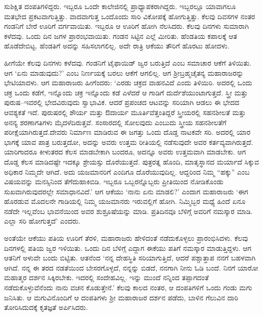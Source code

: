 \vskip 2pt

ಸುಶಿಕ್ಷಿತ ದಂಪತಿಗಳಿದ್ದರು. ಇಬ್ಬರೂ ಒಂದೇ ಕಾಲೇಜಿನಲ್ಲಿ ಪ್ರಾಧ್ಯಾಪಕರಾಗಿದ್ದರು. ಇಬ್ಬರಲ್ಲೂ ಯಾವಾಗಲೂ ಮತಭೇದ ಪ್ರಕಟವಾಗುತ್ತಿತ್ತು. ವಾದವಾಗುತ್ತ ಒಂದೊಂದು ಸಾರಿ ವಿಕೋಪಕ್ಕೆ ಹೋಗುತ್ತಿತ್ತು. ಕೆಲವು ದಿವಸಗಳ ನಂತರ ಗಂಡನಿಗೆ ಬೇರೆ ಊರಿಗೆ ವರ್ಗವಾಯಿತು. ಇಬ್ಬರೂ ಆ ಊರಿಗೆ ಹೋಗಿ ನೆಲಸಿದರು. ಕೆಲವು ದಿನಗಳು ಸುಮಾರಾಗಿ ಕಳೆದವು. ಒಂದು ದಿನ ಜಗಳ ಪ್ರಾರಂಭವಾಯಿತು. ಗಂಡನ ಸಿಟ್ಟಿನ ಎಲ್ಲೆ ಮೀರಿತು. ಹೆಂಡತಿಯ ಕಪಾಲಕ್ಕೆ ಆತ ಹೊಡೆದೇಬಿಟ್ಟ. ಹೆಂಡತಿಗೆ ಅದನ್ನು ಸಹಿಸಲಾಗಲಿಲ್ಲ. ಅದೇ ರಾತ್ರಿ ಆಕೆಯು ತೌರಿಗೆ ಹೊರಟು ಹೋದಳು.

ಹೀಗೆಯೇ ಕೆಲವು ದಿನಗಳು ಕಳೆದವು. ಗಂಡನಿಗೆ ಟೈಫಾಯಿಡ್ ಜ್ವರ ಬರುತ್ತಿದೆ ಎಂಬ ಸಮಾಚಾರ ಆಕೆಗೆ ತಿಳಿಯಿತು. ಆಗ ‘ಏನು ಮಾಡುವುದು?’ ಎಂಬ ನಿರ್ಣಯಕ್ಕೆ ಬರಲು ಆಕೆಗೆ ಆಗಲಿಲ್ಲ. ಆಗ ಶ‍್ರೀಬ್ರಹ್ಮಚೈತನ್ಯ ಮಹಾರಾಜರನ್ನು ಭೇಟಿಯಾದಳು. ಆಗ ಮಹಾರಾಜರು ಹೀಗೆಂದರು: ‘ಎರಡು ಚಕ್ರದ ವಾಹನವಿದೆ ಎಂದು ತಿಳಿಯಿರಿ. ಅದರಲ್ಲಿ ಒಂದು ಚಕ್ರ ಒಂದು ಕಡೆಗೆ, ಇನ್ನೊಂದು ಚಕ್ರ ಇನ್ನೊಂದು ಕಡೆ ಎಳೆದರೆ ಆ ಗಾಡಿಗೆ ದುರ್ದೆಶೆಯುಂಟಾಗುತ್ತದೆ. ಸ್ತ್ರೀ ಮತ್ತು ಪುರುಷ–ಇವರಲ್ಲಿ ಭೇದವಿರುವುದು ಸ್ವಾಭಾವಿಕ. ಆದರೆ ಪ್ರಪಂಚದ ಆಟವನ್ನು ಸರಿಯಾಗಿ ಆಡಲು ಈ ಭೇದದ ಆವಶ್ಯಕತೆ ಇದೆ. ಪುರುಷರಲ್ಲಿ ಶೌರ್ಯ ಮತ್ತು ಔದಾರ್ಯ ಮೂರ್ತಿವೆತ್ತಂತಿದ್ದರೆ ಸ್ತ್ರೀಯರಲ್ಲಿ ಸಹನಶೀಲತೆ ಮತ್ತು ಅನನ್ಯ ಶರಣಾಗತಿಗಳು ಮೈದಳೆದಿರುತ್ತವೆ. ಸಂಸಾರದಲ್ಲಿ ಸೋಲವುದು ಎಂಬುದು ಸ್ತ್ರೀಯ ಸಹನಶೀಲತೆಗೆ ಪರೀಕ್ಷೆಯಾಗಿರುತ್ತದೆ.\break ದೇವರು ನಿರ್ಮಾಣ ಮಾಡಿರುವ ಈ ಜಗತ್ತು ಒಂದು ದೊಡ್ಡ ನಾಟಕವೇ ಸರಿ. ಅದರಲ್ಲಿ ಯಾರ ಭಾಗಕ್ಕೆ ಯಾವ ಪಾತ್ರ ಬರುತ್ತದೋ, ಅದನ್ನು ಅವರು ಉತ್ತಮ ರೀತಿಯಲ್ಲಿ ನಡೆಸುವುದೇ ಅವರ ಕರ್ತವ್ಯವಾಗಿರುತ್ತದೆ. ಯಾರಿಗಾದರೂ ಕೀಳುತರದ ಕೆಲಸ ಮಾಡಬೇಕಾಗಿ ಬಂದರೂ, ಅದನ್ನೂ ಅವರು ಉತ್ತಮವಾಗಿ ಮಾಡಬೇಕು. ಆಗ ದೊಡ್ಡ ಕೆಲಸ ಮಾಡಿದಷ್ಟೇ ಇದಕ್ಕೂ ಶ್ರೇಯಸ್ಸು ದೊರೆಯುತ್ತದೆ. ಪುತ್ರರತ್ನ ಹೊಂದಿ, ಮಾತೃಸ್ಥಾನದ ಮರ್ಯಾದೆ ಸಿಕ್ಕುವ ಅಧಿಕಾರ ನಿಮ್ಮದೇ ಆಗಿದೆ. ಅದು ಯಜಮಾನರಿಗೆ ಎಂದಿಗೂ ದೊರೆಯುವುದಿಲ್ಲ. ಆದ್ದರಿಂದ ನಿಮ್ಮ “ಹಕ್ಕು” ಎಂಬ ವಿಷಯವನ್ನು ಮನಸ್ಸಿನಿಂದ ತೆಗೆದುಹಾಕಿಬಿಡಿ. ಇಬ್ಬರೂ ಒಬ್ಬರನ್ನೊಬ್ಬರು ಪ್ರೀತಿಯಿಂದ ನೋಡಿಕೊಂಡು ಸುಖವಾಗಿರುವುದರಲ್ಲೇ ಸಮಾಧಾನವಿದೆ.’ ಆಗ ಆಕೆಯು ‘ನಾನು ಏನು ಮಾಡಲಿ?’ ಎಂದಾಗ ಮಹಾರಾಜರು ‘ಈಗ ಹೊರಡುವ ಮೊದಲನೇ ಗಾಡಿಯಲ್ಲಿ ನಿಮ್ಮ ಯಜಮಾನರು ಇರುವಲ್ಲಿಗೆ ಹೋಗಿ. ನಿಮ್ಮಿಬ್ಬರ ಮಧ್ಯೆ ಹಿಂದೆ ಏನೂ ನಡೆದೇ ಇಲ್ಲವೆಂಬ ಭಾವನೆಯಿಂದ ಅವರ ಶುಶ್ರೂಷೆಯನ್ನು ಮಾಡಿ. ಪ್ರತಿದಿನವೂ ಬೆಳಿಗ್ಗೆ ಅವರಿಗೆ ನಮಸ್ಕಾರ ಮಾಡಿ. ಎಲ್ಲಾ ಸರಿ ಹೋಗುತ್ತದೆ’ ಎಂದರು.

ಅಂತೆಯೇ ಆಕೆಯು ಪತಿಯ ಊರಿಗೆ ತೆರಳಿ, ಮಹಾರಾಜರು ಹೇಳಿದಂತೆ ನಡೆದುಕೊಳ್ಳಲು ಪ್ರಾರಂಭಿಸಿದಳು. ಕೆಲವು ದಿನಗಳಲ್ಲಿ ಪತಿಯ ಜ್ವರ ಇಳಿಯಿತು. ಒಂದು ದಿನ ಬೆಳಿಗ್ಗೆ ಎದ್ದಾಗ ಈಕೆಯು ಪತಿಗೆ ನಮಸ್ಕಾರ ಮಾಡುತ್ತಿದ್ದಳು. ಆಗ ಆತನಿಗೆ ಅಳುವೇ ಬಂದು ಬಿಟ್ಟಿತು. ಆತನೆಂದ ‘ನನ್ನ ದೇಹಸ್ಥಿತಿ ಸರಿಯಾಗುತ್ತಿದೆ, ಆದರೆ ಪಶ್ಚಾತ್ತಾಪ ನನಗೆ ಬಹಳವಾಗಿ ಆಗಿದೆ. ನನ್ನ ಈ ತರದ ನಡತೆಯಿಂದ ಬೇಸರಗೊಳ್ಳದೆ, ನನ್ನನ್ನು ಬಿಡದೆ, ನನಗಾಗಿ ನೀನು ಓಡಿ ಬಂದೆ. ನಿನಗೆ ಯಾರೋ ಮಹಾತ್ಮರ ದರ್ಶನ ಸಿಕ್ಕಿರಬೇಕು. ಇದರಲ್ಲಿ ಸಂದೇಹವಿಲ್ಲ. ಇನ್ನು ಮುಂದೆ ನನ್ನಿಂದ ತಪ್ಪಾಗದಂತೆ ನಡೆದುಕೊಳ್ಳುವೆನೆಂದು ನಾನು ವಚನ ಕೊಡುತ್ತೇನೆ.’ ಕೆಲವು ಕಾಲದ ನಂತರ, ಆ ದಂಪತಿಗಳಿಗೆ ಒಂದು ಗಂಡು ಮಗು ಜನಿಸಿತು. ಆ ಮಗುವಿನೊಂದಿಗೆ ಆ ದಂಪತಿಗಳು ಶ‍್ರೀ ಮಹಾರಾಜರ ದರ್ಶನ ಪಡೆದು, ಬಾಳಿನ ಗೆಲುವಿನ ದಾರಿ ತೋರಿಸಿದುದಕ್ಕೆ ಕೃತಜ್ಞತೆ ಅರ್ಪಿಸಿದರು.

